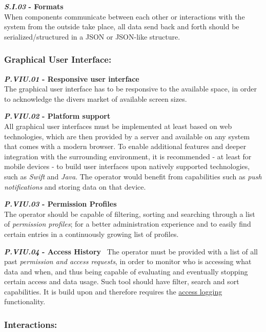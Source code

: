 \documentclass[12pt,english,a4paper,titlepage,cleardoublepage=empty,dottedtoc]{report}
\begin{document}
\textbf{\emph{\protect\hypertarget{si03}{}{S.I.03}} - Formats}\\
When components communicate between each other or interactions with the
system from the outside take place, all data send back and forth should
be serialized/structured in a JSON or JSON-like structure.

\subsubsection{Graphical User
Interface:}\label{graphical-user-interface}

\textbf{\emph{\protect\hypertarget{pviu01}{}{P.VIU.01}} - Responsive
user interface}\\
The graphical user interface has to be responsive to the available
space, in order to acknowledge the divers market of available screen
sizes.

\textbf{\emph{\protect\hypertarget{pviu02}{}{P.VIU.02}} - Platform
support}\\
All graphical user interfaces must be implemented at least based on web
technologies, which are then provided by a server and available on any
system that comes with a modern browser. To enable additional features
and deeper integration with the surrounding environment, it is
recommended - at least for mobile devices - to build user interfaces
upon natively supported technologies, such as \emph{Swift} and
\emph{Java}. The operator would benefit from capabilities such as
\emph{push notifications} and storing data on that device.

\textbf{\emph{\protect\hypertarget{pviu03}{}{P.VIU.03}} - Permission
Profiles}\\
The operator should be capable of filtering, sorting and searching
through a list of \emph{permission profiles}; for a better
administration experience and to easily find certain entries in a
continuously growing list of profiles.

\textbf{\emph{\protect\hypertarget{pviu04}{}{P.VIU.04}} - Access
History}~ The operator must be provided with a list of all past
\emph{permission and access requests}, in order to monitor who is
accessing what data and when, and thus being capable of evaluating and
eventually stopping certain access and data usage. Such tool should have
filter, search and sort capabilities. It is build upon and therefore
requires the \protect\hyperlink{pb01}{access logging} functionality.

\subsubsection{Interactions:}\label{interactions}
\end{document}
